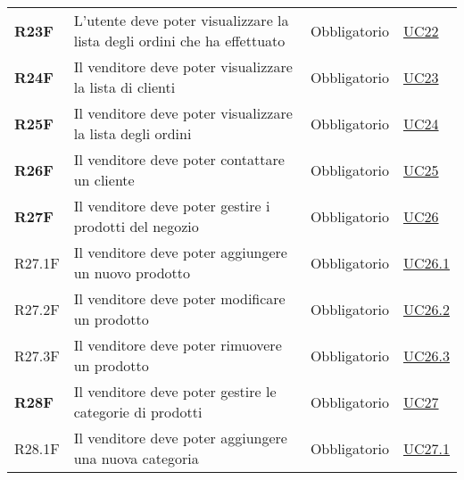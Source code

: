 \begin{center}
\begin{longtable}[!h]{p{50px} p{210px} p{80px} p{50px}}
        \textbf{R23F}                         & L'utente deve poter visualizzare la lista degli ordini che ha effettuato                            & Obbligatorio             & \hyperref[sec:UC22]{UC22}                    \\
        \textbf{R24F}                         & Il venditore deve poter visualizzare la lista di clienti                                            & Obbligatorio             & \hyperref[sec:UC23]{UC23}                    \\
        \textbf{R25F}                         & Il venditore deve poter visualizzare la lista degli ordini                                          & Obbligatorio             & \hyperref[sec:UC24]{UC24}                    \\
        \textbf{R26F}                         & Il venditore deve poter contattare un cliente                                                       & Obbligatorio             & \hyperref[sec:UC25]{UC25}                    \\
        \textbf{R27F}                         & Il venditore deve poter gestire i prodotti del negozio                                              & Obbligatorio             & \hyperref[sec:UC26]{UC26}                    \\
        R27.1F                                & Il venditore deve poter aggiungere un nuovo prodotto                                                & Obbligatorio             & \hyperref[sec:UC26.1]{UC26.1}                \\
        R27.2F                                & Il venditore deve poter modificare un prodotto                                                      & Obbligatorio             & \hyperref[sec:UC26.2]{UC26.2}                \\
        R27.3F                                & Il venditore deve poter rimuovere un prodotto                                                       & Obbligatorio             & \hyperref[sec:UC26.3]{UC26.3}                \\
        \textbf{R28F}                         & Il venditore deve poter gestire le categorie di prodotti                                            & Obbligatorio             & \hyperref[sec:UC27]{UC27}                    \\
        R28.1F                                & Il venditore deve poter aggiungere una nuova categoria                                              & Obbligatorio             & \hyperref[sec:UC27.1]{UC27.1}                \\

\end{longtable}
\end{center}
